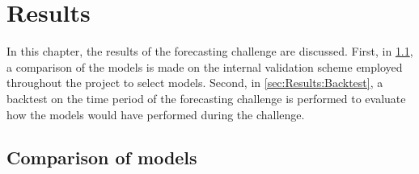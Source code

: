 \newpage
\section{Results}
\label{ch:Results}

In this chapter, the results of the forecasting challenge are discussed. First, in \cref{sec:Results:ComparisonModels}, a comparison of the models is made on the internal validation scheme employed throughout the project to select models. Second, in \cref{sec:Results:Backtest}, a backtest on the time period of the forecasting challenge is performed to evaluate how the models would have performed during the challenge.

\subsection{Comparison of models}
\label{sec:Results:ComparisonModels}

